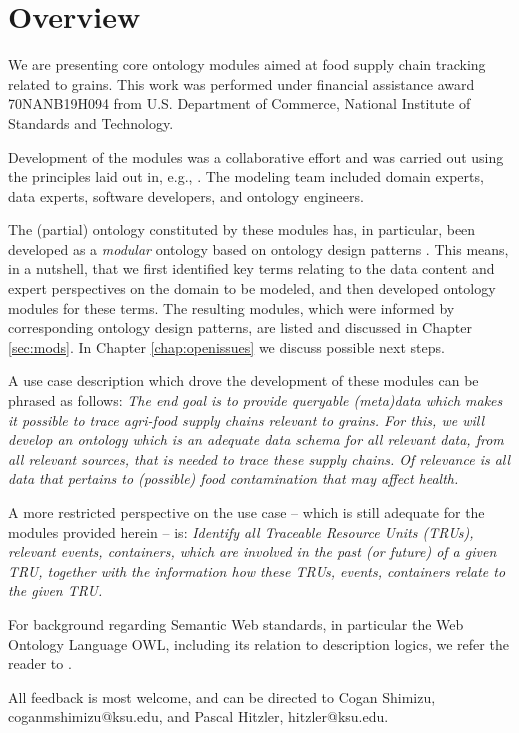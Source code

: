 \chapter{Overview}

We are presenting core ontology modules aimed at food supply chain tracking related to grains. This work was performed under financial assistance award 70NANB19H094 from U.S. Department of Commerce, National Institute of Standards and Technology.

Development of the modules was a collaborative effort and was carried out using the principles laid out in, e.g., \cite{KrisnadhiH16,KrisnadhiKHARJ16,enslaved-jws,iccs18-invited}. The modeling team included domain experts, data experts, software developers, and ontology engineers. 

The (partial) ontology constituted by these modules has, in particular, been developed as a \emph{modular} ontology \cite{HitzlerGJKP17,iccs18-invited} based on ontology design patterns \cite{HGJKP2016,MODL}. This means, in a nutshell, that we first identified key terms relating to the data content and expert perspectives on the domain to be modeled, and then developed ontology modules for these terms. The resulting modules, which were informed by corresponding ontology design patterns, are listed and discussed in Chapter \ref{sec:mods}. In Chapter \ref{chap:openissues} we discuss possible next steps.

A use case description which drove the development of these modules can be phrased as follows: \emph{The end goal is to provide queryable (meta)data which makes it possible to trace agri-food supply chains relevant to grains. For this, we will develop an ontology which is an adequate data schema for all relevant data, from all relevant sources, that is needed to trace these supply chains. Of relevance is all data that pertains to (possible) food contamination that may affect health.}

A more restricted perspective on the use case -- which is still adequate for the modules provided herein -- is: \emph{Identify all Traceable Resource Units (TRUs), relevant events, containers, which are involved in the past (or future) of a given TRU, together with the information how these TRUs, events, containers relate to the given TRU.}

For background regarding Semantic Web standards, in particular the Web Ontology Language OWL, including its relation to description logics, we refer the reader to \cite{owl2-primer, FOST}.

All feedback is most welcome, and can be directed to Cogan Shimizu, coganmshimizu@ksu.edu, and Pascal Hitzler, hitzler@ksu.edu.


